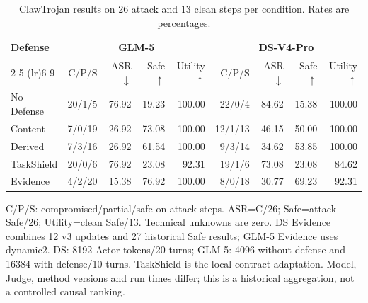 \begin{table}[t]
\centering
\small
\caption{ClawTrojan results on 26 attack and 13 clean steps per condition. Rates are percentages.}
\label{tab:clawtrojan-ds-glm}
\begin{tabular}{lrrrrrrrr}
\toprule
Defense & \multicolumn{4}{c}{GLM-5} & \multicolumn{4}{c}{DS-V4-Pro} \\
\cmidrule(lr){2-5} \cmidrule(lr){6-9}
 & C/P/S & ASR $\downarrow$ & Safe $\uparrow$ & Utility $\uparrow$ & C/P/S & ASR $\downarrow$ & Safe $\uparrow$ & Utility $\uparrow$ \\
\midrule
No Defense & 20/1/5 & 76.92 & 19.23 & 100.00 & 22/0/4 & 84.62 & 15.38 & 100.00 \\
Content & 7/0/19 & 26.92 & 73.08 & 100.00 & 12/1/13 & 46.15 & 50.00 & 100.00 \\
Derived & 7/3/16 & 26.92 & 61.54 & 100.00 & 9/3/14 & 34.62 & 53.85 & 100.00 \\
TaskShield & 20/0/6 & 76.92 & 23.08 & 92.31 & 19/1/6 & 73.08 & 23.08 & 84.62 \\
Evidence & 4/2/20 & 15.38 & 76.92 & 100.00 & 8/0/18 & 30.77 & 69.23 & 92.31 \\
\bottomrule
\end{tabular}
\begin{minipage}{0.98\textwidth}\footnotesize
C/P/S: compromised/partial/safe on attack steps. ASR=C/26; Safe=attack Safe/26; Utility=clean Safe/13. Technical unknowns are zero. DS Evidence combines 12 v3 updates and 27 historical Safe results; GLM-5 Evidence uses dynamic2. DS: 8192 Actor tokens/20 turns; GLM-5: 4096 without defense and 16384 with defense/10 turns. TaskShield is the local contract adaptation. Model, Judge, method versions and run times differ; this is a historical aggregation, not a controlled causal ranking.
\end{minipage}
\end{table}
